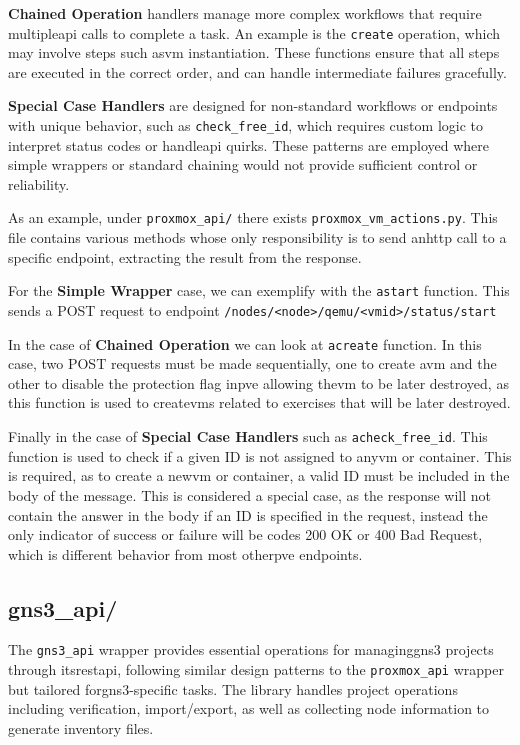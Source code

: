             \textbf{Chained Operation} handlers manage more complex workflows that require multiple\ac{api} calls to complete 
            a task. An example is the \texttt{create} operation, which may involve steps such as\ac{vm} instantiation. These 
            functions ensure that all steps are executed in the correct order, and can handle intermediate failures gracefully.

            \textbf{Special Case Handlers} are designed for non-standard workflows or endpoints with unique behavior, such as 
            \texttt{check\_free\_id}, which requires custom logic to interpret status codes or handle\ac{api} quirks. These 
            patterns are employed where simple wrappers or standard chaining would not provide sufficient control or reliability.
                
            As an example, under \texttt{proxmox\_api/} there exists \texttt{proxmox\_vm\_actions.py}. This file contains various methods
            whose only responsibility is to send an\ac{http} call to a specific endpoint, extracting the result from the response.

            For the \textbf{Simple Wrapper} case, we can exemplify with the \texttt{astart} function. This sends a POST request to 
            endpoint \texttt{/nodes/<node>/qemu/<vmid>/status/start}

            In the case of \textbf{Chained Operation} we can look at \texttt{acreate} function. In this case, two POST requests must be 
            made sequentially, one to create a\ac{vm} and the other to disable the protection flag in\ac{pve} allowing the\ac{vm} to be 
            later destroyed, as this function is used to create\ac{vm}s related to exercises that will be later destroyed.

            Finally in the case of \textbf{Special Case Handlers} such as \texttt{acheck\_free\_id}. This function is used to check if a 
            given ID is not assigned to any\ac{vm} or container. This is required, as to create a new\ac{vm} or container, a valid ID 
            must be included in the body of the message. This is considered a special case, as the response will not contain the answer 
            in the body if an ID is specified in the request, instead the only indicator of success or failure will be codes 200 OK or 400
            Bad Request, which is different behavior from most other\ac{pve} endpoints.

    \subsection{gns3\_api/}
        The \texttt{gns3\_api} wrapper provides essential operations for managing\ac{gns3} projects through its\ac{rest}\ac{api}, following 
        similar design patterns to the \texttt{proxmox\_api} wrapper but tailored for\ac{gns3}-specific tasks. The library handles 
        project operations including verification, import/export, as well as collecting node information to generate inventory files.

